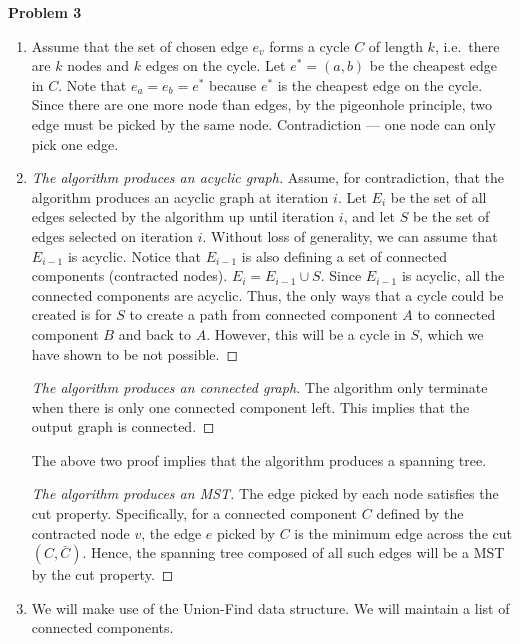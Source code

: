 \documentclass[a4paper]{/Users/dawei/.dotfiles/templates/preamble}
\begin{document}
\noindent\textbf{Problem 3}
  \begin{enumerate}[label = (\alph*)]
  \item Assume that the set of chosen edge $e_v$ forms a cycle $C$ of length
    $k$, i.e.\ there are $k$ nodes and $k$ edges on the cycle. Let $e^*
    = (a,b)$ be the cheapest edge in $C$. Note that $e_a = e_b = e^*$ because
    $e^*$ is the cheapest edge on the cycle. Since there are one more node
    than edges, by the pigeonhole principle, two edge must be picked by the
    same node. Contradiction --- one node can only pick one edge.
  \item 
    \begin{proof}[The algorithm produces an acyclic graph]
      Assume, for contradiction, that the algorithm produces an acyclic graph
      at iteration $i$. Let $E_{i}$ be the set of all edges selected by the
      algorithm up until iteration $i$, and let $S$ be the set of edges
      selected on iteration $i$. Without loss of generality, we can assume that
      $E_{i-1}$ is acyclic. Notice that $E_{i-1}$ is also defining a set of
      connected components (contracted nodes). $E_i = E_{i-1} \cup S$. Since
      $E_{i-1}$ is acyclic, all the connected components are acyclic. Thus, the
      only ways that a cycle could be created is for $S$ to create a path from
      connected component $A$ to connected component $B$ and back to $A$.
      However, this will be a cycle in $S$, which we have shown to be not
      possible.
    \end{proof}
    \begin{proof}[The algorithm produces an connected graph]
      The algorithm only terminate when there is only one connected component left.
      This implies that the output graph is connected.
    \end{proof}
    The above two proof implies that the algorithm produces a spanning tree.
    \begin{proof}[The algorithm produces an MST]
      The edge picked by each node satisfies the cut property. Specifically,
      for a connected component $C$ defined by the contracted node $v$, the
      edge $e$ picked by $C$ is the minimum edge across the cut $(C, \bar{C})$.
      Hence, the spanning tree composed of all such edges will be a MST by the
      cut property.
    \end{proof}
  \item We will make use of the Union-Find data structure. We will maintain
    a list of connected components.
    \begin{algorithmic}

\end{algorithmic}
\end{enumerate}
\end{document}
